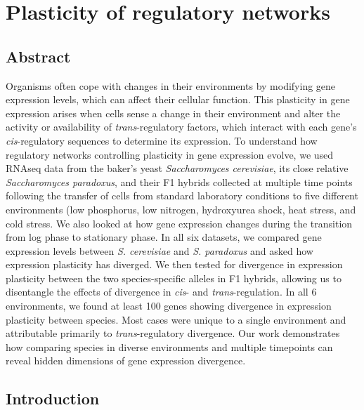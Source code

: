 \chapter{Plasticity of regulatory networks}
\label{chpt:plasticity}

\section{Abstract}

Organisms often cope with changes in their environments by modifying gene expression levels, which can affect their cellular function. This plasticity in gene expression arises when cells sense a change in their environment and alter the activity or availability of \textit{trans}-regulatory factors, which interact with each gene’s \textit{cis}-regulatory sequences to determine its expression. To understand how regulatory networks controlling plasticity in gene expression evolve, we used RNAseq data from the baker’s yeast \textit{Saccharomyces cerevisiae}, its close relative \textit{Saccharomyces paradoxus}, and their F1 hybrids collected at multiple time points following the transfer of cells from standard laboratory conditions to five different environments (low phosphorus, low nitrogen, hydroxyurea shock, heat stress, and cold stress. We also looked at how gene expression changes during the transition from log phase to stationary phase. In all six datasets, we compared gene expression levels between  \textit{S. cerevisiae} and  \textit{S. paradoxus} and asked how expression plasticity has diverged. We then tested for divergence in expression plasticity between the two species-specific alleles in F1 hybrids, allowing us to disentangle the effects of divergence in \textit{cis}- and \textit{trans}-regulation. In all 6 environments, we found at least 100 genes showing divergence in expression plasticity between species. Most cases were unique to a single environment and attributable primarily to  \textit{trans}-regulatory divergence. Our work demonstrates how comparing species in diverse environments and multiple timepoints can reveal hidden dimensions of gene expression divergence.

\section{Introduction}

